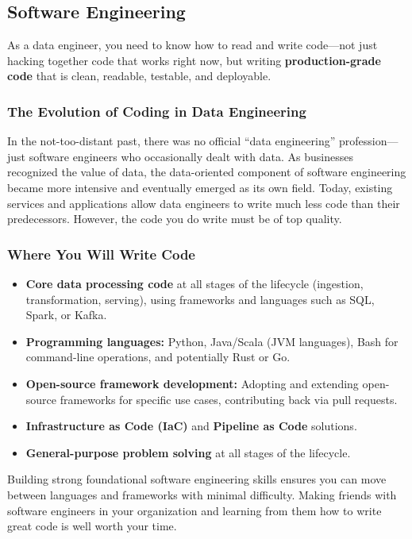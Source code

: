 \documentclass{article}
\begin{document}
\subsection{Software Engineering}
As a data engineer, you need to know how to read and write code---not just hacking together code that works right now, but writing \textbf{production-grade code} that is clean, readable, testable, and deployable.

\subsubsection{The Evolution of Coding in Data Engineering}
In the not-too-distant past, there was no official ``data engineering'' profession---just software engineers who occasionally dealt with data. As businesses recognized the value of data, the data-oriented component of software engineering became more intensive and eventually emerged as its own field. Today, existing services and applications allow data engineers to write much less code than their predecessors. However, the code you do write must be of top quality.

\subsubsection{Where You Will Write Code}
\begin{itemize}
    \item \textbf{Core data processing code} at all stages of the lifecycle (ingestion, transformation, serving), using frameworks and languages such as SQL, Spark, or Kafka.
    \item \textbf{Programming languages:} Python, Java/Scala (JVM languages), Bash for command-line operations, and potentially Rust or Go.
    \item \textbf{Open-source framework development:} Adopting and extending open-source frameworks for specific use cases, contributing back via pull requests.
    \item \textbf{Infrastructure as Code (IaC)} and \textbf{Pipeline as Code} solutions.
    \item \textbf{General-purpose problem solving} at all stages of the lifecycle.
\end{itemize}
Building strong foundational software engineering skills ensures you can move between languages and frameworks with minimal difficulty. Making friends with software engineers in your organization and learning from them how to write great code is well worth your time.
\end{document}
